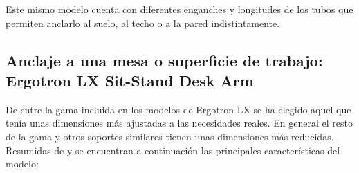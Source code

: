  Este mismo modelo cuenta con diferentes enganches y longitudes de los tubos que permiten anclarlo al suelo, al techo o a la pared indistintamente.

\subsection{Anclaje a una mesa o superficie de trabajo: Ergotron LX Sit-Stand Desk Arm}

 De entre la gama incluida en los modelos de Ergotron LX se ha elegido aquel que tenía unas dimensiones más ajustadas a las necesidades reales. En general el resto de la gama y otros soportes similares tienen unas dimensiones más reducidas. Resumidas de \cite{LXSitStand:2018} y \cite{LXSitStandWeb:2018} se encuentran a continuación las principales características del modelo:

